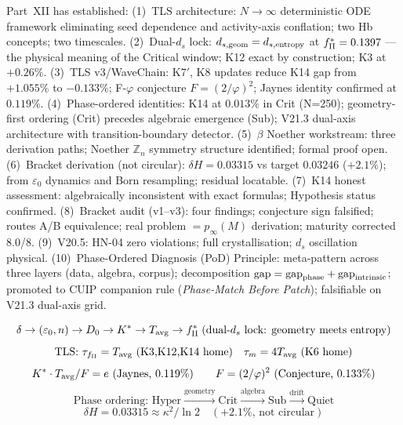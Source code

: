 \documentclass[12pt, a4paper]{article}
\begin{document}
Part~XII has established:
(1)~TLS architecture: $N\to\infty$ deterministic ODE framework eliminating seed dependence and activity-axis conflation; two Hb concepts; two timescales.
(2)~Dual-$d_s$ lock: $d_{s,\rm geom} = d_{s,\rm entropy}$ at $f_{\rm II}^* = 0.1397$ --- the physical meaning of the Critical window; K12 exact by construction; K3 at $+0.26\%$.
(3)~TLS v3/WaveChain: K7$'$, K8 updates reduce K14 gap from $+1.055\%$ to $-0.133\%$; F-$\varphi$ conjecture $F = (2/\varphi)^2$; Jaynes identity confirmed at $0.119\%$.
(4)~Phase-ordered identities: K14 at $0.013\%$ in Crit (N=250); geometry-first ordering (Crit) precedes algebraic emergence (Sub); V21.3 dual-axis architecture with transition-boundary detector.
(5)~$\beta$ Noether workstream: three derivation paths; Noether $\mathbb{Z}_n$ symmetry structure identified; formal proof open.
(6)~Bracket derivation (not circular): $\delta H = 0.03315$ vs target $0.03246$ ($+2.1\%$); from $\varepsilon_0$ dynamics and Born resampling; residual locatable.
(7)~K14 honest assessment: algebraically inconsistent with exact formulas; Hypothesis status confirmed.
(8)~Bracket audit (v1--v3): four findings; conjecture sign falsified; routes A/B equivalence; real problem $= p_\infty(M)$ derivation; maturity corrected 8.0/8.
(9)~V20.5: HN-04 zero violations; full crystallisation; $d_s$ oscillation physical.
(10)~Phase-Ordered Diagnosis (PoD) Principle: meta-pattern across three layers (data, algebra, corpus); decomposition $\text{gap} = \text{gap}_{\rm phase} + \text{gap}_{\rm intrinsic}$; promoted to CUIP companion rule (\emph{Phase-Match Before Patch}); falsifiable on V21.3 dual-axis grid.

\[
  \delta\to(\varepsilon_0, n)\to D_0\to K^*\to T_{\rm avg}\to f_{\rm II}^*
  \;\text{(dual-$d_s$ lock: geometry meets entropy)}
\]
\[
  \text{TLS: }\tau_{f_{\rm II}}=T_{\rm avg}\text{ (K3,K12,K14 home)}
  \quad\tau_m=4T_{\rm avg}\text{ (K6 home)}
\]
\[
  K^*\cdot T_{\rm avg}/F = e\text{ (Jaynes, 0.119\%)}
  \qquad F=(2/\varphi)^2\text{ (Conjecture, 0.133\%)}
\]
\[
  \text{Phase ordering: Hyper}\xrightarrow{\text{geometry}}\text{Crit}
  \xrightarrow{\text{algebra}}\text{Sub}\xrightarrow{\text{drift}}\text{Quiet}
\]
\[
  \delta H = 0.03315\approx\kappa^2/\ln 2\quad(+2.1\%\text{, not circular})
\]



\end{document}
